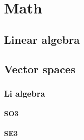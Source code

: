 \chapter{Math}
\section{Linear algebra}
\section{Vector spaces}
    \subsection{Li algebra}
        \subsubsection{SO3}
        \subsubsection{SE3}
        